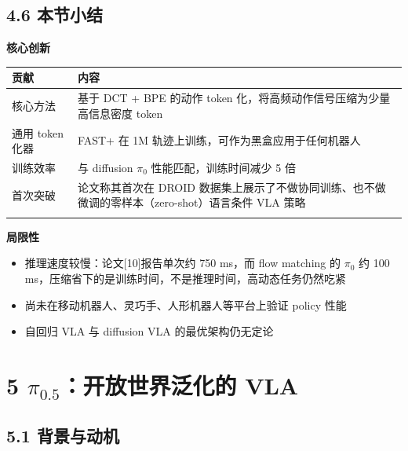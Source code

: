 \documentclass[
  chinese,
]{ctexart}
\providecommand{\tightlist}{%
  \setlength{\itemsep}{0pt}\setlength{\parskip}{0pt}}
\begin{document}
\subsection{4.6 本节小结}\label{ux672cux8282ux5c0fux7ed3-2}

\textbf{核心创新}

\begin{center}
\begin{tabular}{@{}>{\raggedright\arraybackslash}p{} >{\raggedright\arraybackslash}p{}@{}}
\toprule\noalign{}
贡献 & 内容 \\
\midrule\noalign{}
核心方法 & 基于 DCT + BPE 的动作 token 化，将高频动作信号压缩为少量高信息密度 token \\
通用 token 化器 & FAST+ 在 1M 轨迹上训练，可作为黑盒应用于任何机器人 \\
训练效率 & 与 diffusion \(\pi_0\) 性能匹配，训练时间减少 5 倍 \\
首次突破 & 论文称其首次在 DROID 数据集上展示了不做协同训练、也不做微调的零样本（zero-shot）语言条件 VLA 策略 \\
\bottomrule\noalign{}
\end{tabular}
\end{center}

\textbf{局限性}

\begin{itemize}
\tightlist
\item
  推理速度较慢：论文{[}10{]}报告单次约 750 ms，而 flow matching 的
  \(\pi_0\) 约 100
  ms，压缩省下的是训练时间，不是推理时间，高动态任务仍然吃紧
\item
  尚未在移动机器人、灵巧手、人形机器人等平台上验证 policy 性能
\item
  自回归 VLA 与 diffusion VLA 的最优架构仍无定论
\end{itemize}

\section{\texorpdfstring{5 \(\pi_{0.5}\)：开放世界泛化的
VLA}{5 \textbackslash pi\_\{0.5\}：开放世界泛化的 VLA}}\label{pi_0.5ux5f00ux653eux4e16ux754cux6cdbux5316ux7684-vla}

\subsection{5.1 背景与动机}\label{ux80ccux666fux4e0eux52a8ux673a-3}
\end{document}
